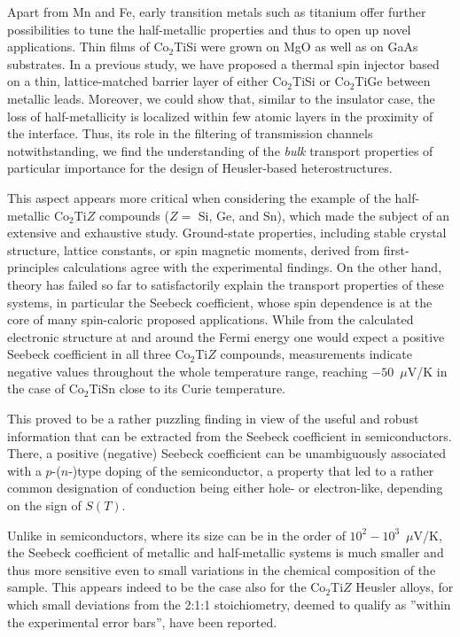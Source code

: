 \documentclass[aps,prb,twocolumn,superscriptaddress,showpacs]{revtex4}
\begin{document}
Apart from Mn and Fe, early transition metals such as titanium offer
further possibilities to tune the half-metallic properties and thus to
open up novel applications. 
Thin films of Co$_2$TiSi were grown on MgO\cite{MSW+11} 
as well as on GaAs substrates.\cite{DH15}
In a previous study, we have proposed  a thermal 
spin injector based on a thin, lattice-matched  barrier 
layer of either Co$_2$TiSi or Co$_2$TiGe
between metallic leads.\cite{GKP14}
Moreover, we could show that, similar to the insulator case, 
the loss of half-metallicity is localized 
within few atomic layers in the proximity of the interface. 
Thus, its role in the filtering of transmission channels
notwithstanding, we find the understanding of 
the {\em bulk} transport properties of particular importance for 
the design of Heusler-based heterostructures.


This aspect appears more critical when considering the example
of the half-metallic Co$_2$Ti$Z$ compounds ($Z=$ Si, Ge, and Sn), 
which made the subject of an extensive and exhaustive study.\cite{BFB+10} 
Ground-state properties,
including stable crystal structure, lattice constants, 
or spin magnetic moments, derived from first-principles calculations 
agree with the experimental findings.\cite{LLBS05,KFF07,SSK10,BFB+10}
On the other hand, theory has failed so far to satisfactorily explain the
transport properties of these systems, in particular
the Seebeck coefficient, whose spin dependence is at the 
core of many spin-caloric proposed applications.
While from the calculated electronic structure at 
and around the Fermi energy one would expect 
a positive Seebeck coefficient in all three Co$_2$Ti$Z$
compounds,\cite{BFB+10,GKP14} 
measurements indicate negative values
throughout the whole temperature range,
reaching $-50$~$\mu$V/K in the 
case of Co$_2$TiSn close to its Curie temperature.\cite{BFB+10,BOG+10} 


This proved to be a rather puzzling finding in view of the useful and
robust information that can be extracted from the Seebeck coefficient
in semiconductors. There, a positive (negative) Seebeck 
coefficient can be unambiguously associated with a $p$-($n$-)type 
doping of the semiconductor, a property that led to a rather 
common designation of conduction being either hole- or electron-like,
depending on the sign of $S(T)$. 

Unlike in semiconductors, where its size can be in the 
order of $10^2-10^3$~$\mu$V/K, the Seebeck coefficient of
metallic and half-metallic 
systems is much smaller and thus more sensitive even to 
small variations in the chemical composition of the sample. 
This appears indeed to be the case also for the
Co$_2$Ti$Z$ Heusler alloys, for which small deviations
from the 2:1:1 stoichiometry, deemed to qualify as 
''within the experimental error bars'', 
have been reported.\cite{BFB+10}
 
\end{document}
